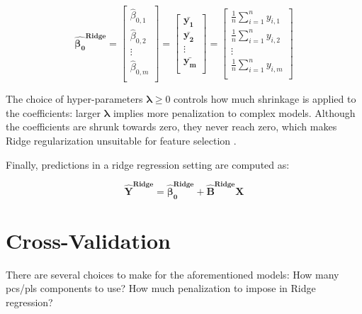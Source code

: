 \begin{equation}
	\label{eqn:ridge-betazero}
		\boldsymbol{\hat{\beta_0}^\text{Ridge}} =
		\begin{bmatrix}
			
			\hat{\beta}_{0,1}\\
			\hat{\beta}_{0,2}\\
			\vdots \\
			\hat{\beta}_{0,m}\\
		\end{bmatrix}
	=
	\begin{bmatrix}
		
		\mathbf{\bar{y_1}}\\
		\mathbf{\bar{y_2}}\\
		\vdots \\
		\mathbf{\bar{y_m}}\\
	\end{bmatrix}
	=
	\begin{bmatrix}
		
		\frac{1}{n}\sum_{i = 1}^{n} y_{i,1}\\
		\frac{1}{n}\sum_{i = 1}^{n} y_{i,2}\\
		\vdots \\
		\frac{1}{n}\sum_{i = 1}^{n} y_{i,m}\\
	\end{bmatrix} 
\end{equation}

The choice of hyper-parameters $\boldsymbol{\lambda} \geq 0$ controls how much shrinkage is applied to the coefficients: larger $\boldsymbol{\lambda}$ implies more penalization to complex models. Although the coefficients are shrunk towards zero, they never reach zero, which makes Ridge regularization unsuitable for feature selection \parencite{friedman2001}.
 
 Finally, predictions in a ridge regression setting are computed as:
 
 \begin{equation}
 	\label{eqn:ridge-yhat}
 	\mathbf{\hat{Y}^\text{Ridge}} = \boldsymbol{\hat{\beta}_0^\text{Ridge}} + \mathbf{\hat{B}^\text{Ridge}} \mathbf{X}
 \end{equation}

\section{Cross-Validation}
\label{sec:crossval}

There are several choices to make for the aforementioned models: How many \acrshort{pc}s/\acrshort{pls} components to use? How much penalization to impose in Ridge regression? 

